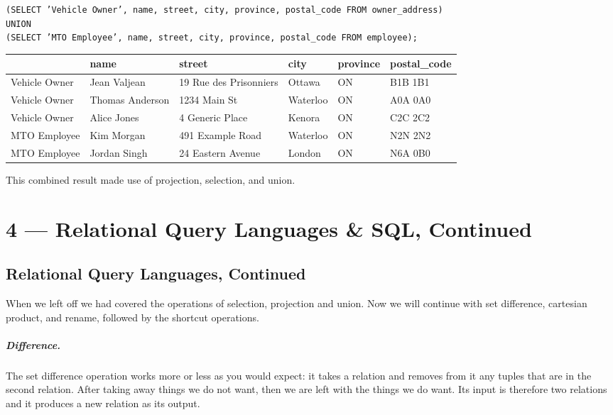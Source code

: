 \documentclass[a4paper]{report}
\begin{document}
\texttt{(SELECT 'Vehicle Owner', name, street, city, province, postal\_code FROM owner\_address)\\
UNION\\
(SELECT 'MTO Employee', name, street, city, province, postal\_code FROM employee);}

\begin{center}
	\begin{tabular}{|l|l|l|l|l|l|}\hline
		\textbf{} & \textbf{name} &\textbf{street} & \textbf{city} & \textbf{province} & \textbf{postal\_code} \\ \hline
		Vehicle Owner & Jean Valjean & 19 Rue des Prisonniers & Ottawa & ON & B1B 1B1\\ \hline
		Vehicle Owner & Thomas Anderson & 1234 Main St & Waterloo & ON & A0A 0A0\\ \hline
		Vehicle Owner & Alice Jones & 4 Generic Place & Kenora & ON & C2C 2C2\\ \hline
		MTO Employee & Kim Morgan & 491 Example Road & Waterloo & ON & N2N 2N2\\ \hline
		MTO Employee & Jordan Singh & 24 Eastern Avenue & London & ON & N6A 0B0\\ \hline
	\end{tabular}
\end{center}

This combined result made use of projection, selection, and union. 









\chapter*{4 --- Relational Query Languages \& SQL, Continued}


\section*{Relational Query Languages, Continued}

When we left off we had covered the operations of selection, projection and union. Now we will continue with set difference, cartesian product, and rename, followed by the shortcut operations. 

\paragraph{Difference.} The set difference operation works more or less as you would expect: it takes a relation and removes from it any tuples that are in the second relation. After taking away things we do not want, then we are left with the things we do want. Its input is therefore two relations and it produces a new relation as its output.
\end{document}
